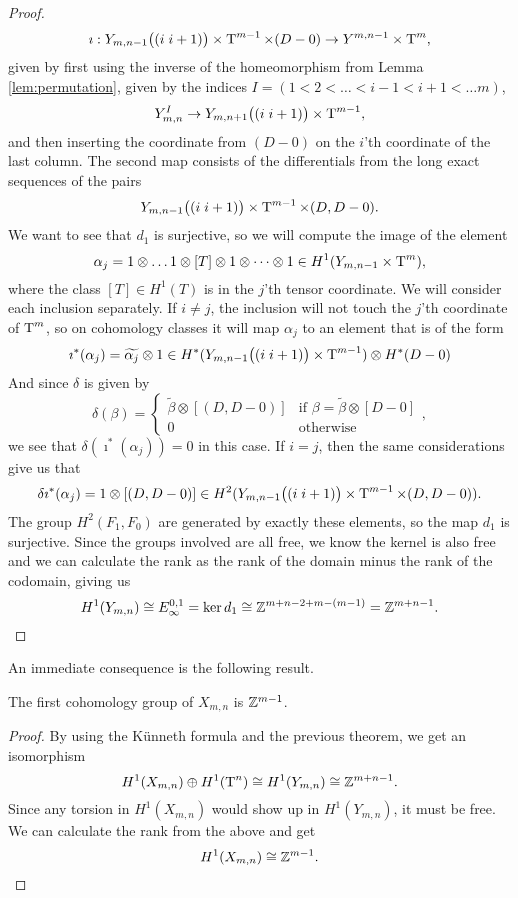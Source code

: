 \begin{proof}
  \[ \imath : Y_{m,n-1}\big((i\; i+1)\big) \times \operatorname{T}^{m-1} \times (D-0)
  \to Y^{m,n-1}\times \operatorname{T}^m, \] 
  given by first using the inverse of the homeomorphism from Lemma
  \ref{lem:permutation}, given by the indices $I = (1 < 2 < \dots <
  i-1 < i+1 < \dots m)$,
  \[ Y_{m,n}^I \to Y_{m,n+1}\big((i \; i+1)\big) \times \operatorname{T}^{m-1}, \]
  and then inserting the coordinate from $(D-0)$ on the $i$'th
  coordinate of the last column. 
  The second map consists of the differentials from the long exact
  sequences of the pairs
  \[ Y_{m,n-1}\big((i\; i+1)\big) \times \operatorname{T}^{m-1}\times (D,D-0). \]
  We want to see that $d_1$ is surjective, so we will compute the
  image of the element 
  \[ \alpha_j = 1\otimes\dots 1\otimes [T] \otimes 1 \otimes \dots
  \otimes 1 \in H^1(Y_{m,n-1}\times \operatorname{T}^{m}),\] 
  where the class $[T]\in H^1(T)$ is in the $j$'th tensor coordinate.
  We will consider each inclusion separately. If $i \neq j$, the
  inclusion will not touch the $j$'th coordinate of $\operatorname{T}^m$, so on
  cohomology classes it will map $\alpha_j$ to an element that is of
  the form
  \[ \imath^*(\alpha_j) = \widetilde{\alpha_j}\otimes 1 \in
  H^*(Y_{m,n-1}\big((i\; i+1) \big) \times \operatorname{T}^{m-1}) \otimes
  H^*(D-0) \]
  And since $\delta$ is given by 
  \[ \delta(\beta) =
  \begin{cases}
    \widetilde{\beta}\otimes [(D,D-0)] & \text{if } \beta =
    \widetilde{\beta}\otimes [D-0] \\
    0 & \text{otherwise}
  \end{cases}, \]
  we see that $\delta(\imath^*(\alpha_j)) = 0$ in this case. If $i =
  j$, then the same considerations give us that
  \[ \delta\imath^*(\alpha_j) = 1 \otimes [(D,D-0)] \in
  H^2(Y_{m,n-1}\big((i\; i+1) \big) \times \operatorname{T}^{m-1}\times (D,D-0)). \]
  The group $H^2(F_1,F_0)$ are generated by exactly these elements, so
  the map $d_1$ is surjective. Since the groups involved are all free,
  we know the kernel is also free and we can calculate the rank as the
  rank of the domain minus the rank of the codomain, giving us
  \[ H^1(Y_{m,n}) \cong E_{\infty}^{0,1} = \ker d_1 \cong
  \mathbb{Z}^{m+n-2+m-(m-1)} = \mathbb{Z}^{m+n-1}. \]
\end{proof}

An immediate consequence is the following result.

\begin{corollary}
  The first cohomology group of $X_{m,n}$ is $\mathbb{Z}^{m-1}$.
\end{corollary}
\begin{proof}
  By using the Künneth formula and the previous theorem, we get an
  isomorphism 
  \[ H^1(X_{m,n}) \oplus H^1(\operatorname{T}^n) \cong  H^1(Y_{m,n}) \cong
  \mathbb{Z}^{m+n-1}. \]
  Since any torsion in $H^1(X_{m,n})$ would show up in $H^1(Y_{m,n})$,
  it must be free. We can calculate the rank from the above and get
  \[ H^1(X_{m,n}) \cong \mathbb{Z}^{m-1}. \]
\end{proof}

